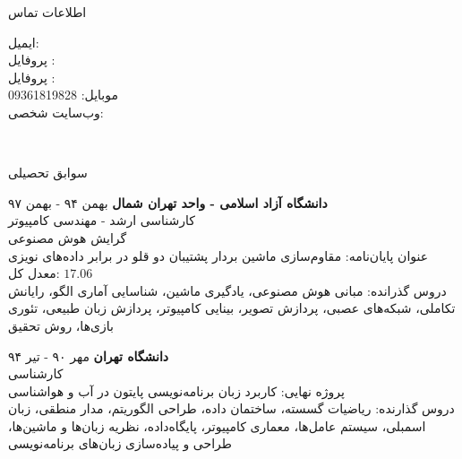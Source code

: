 \documentclass{resume} %
\begin{document}



\begin{rSection}{اطلاعات تماس}
\begin{multicols}{2}
ایمیل: \\
پروفایل :  \\
پروفایل :  \\

\vfill\null
\columnbreak
موبایل: 09361819828 \\
وب‌سایت شخصی: \\
\end{multicols}
\end{rSection}
~\\[-2cm]
\begin{rSection}{سوابق تحصیلی}

{\textbf{دانشگاه آزاد اسلامی - واحد تهران شمال}} \hfill {بهمن ۹۴ - بهمن ۹۷} \\ 
کارشناسی ارشد - مهندسی کامپیوتر \\
گرایش هوش مصنوعی \smallskip \\
عنوان پایان‌نامه: مقاوم‌سازی ماشین بردار پشتیبان دو قلو در برابر داده‌های نویزی \\
معدل کل: $17.06$ \\
دروس گذرانده: مبانی هوش مصنوعی، یادگیری ماشین، شناسایی آماری الگو، رایانش تکاملی، شبکه‌های عصبی، پردازش تصویر، بینایی کامپیوتر، پردازش زبان طبیعی، تئوری بازی‌ها، روش تحقیق


%
{\textbf{دانشگاه تهران}} \hfill {مهر ۹۰ - تیر ۹۴} \\
کارشناسی \\
پروژه نهایی: کاربرد زبان برنامه‌نویسی پایتون در آب ‌و ‌هواشناسی \\
دروس گذارنده: ریاضیات گسسته، ساختمان داده، طراحی الگوریتم، مدار منطقی، زبان اسمبلی، سیستم عامل‌ها، معماری کامپیوتر، پایگاه‌داده، نظریه زبان‌ها و ماشین‌ها، طراحی و پیاده‌سازی زبان‌های برنامه‌نویسی
\end{rSection}
\end{document}
